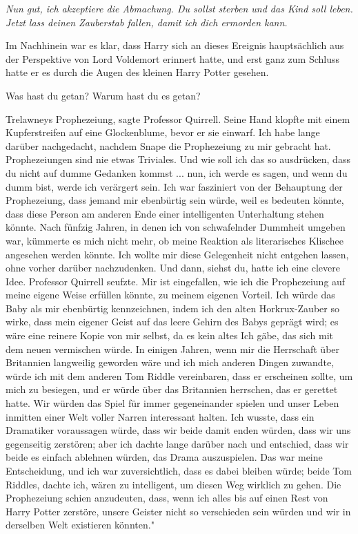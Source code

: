 \glqq{}\emph{Nun gut, ich akzeptiere die Abmachung. Du sollst sterben und das
Kind soll leben. Jetzt lass deinen Zauberstab fallen, damit ich dich ermorden
kann.}\grqq{}

Im Nachhinein war es klar, dass Harry sich an dieses Ereignis hauptsächlich aus
der Perspektive von Lord Voldemort erinnert hatte, und erst ganz zum Schluss
hatte er es durch die Augen des kleinen Harry Potter gesehen.

\glqq{}Was hast du getan? Warum hast du es getan?\grqq{}

\glqq{}Trelawneys Prophezeiung\grqq{}, sagte Professor Quirrell. Seine Hand
klopfte mit einem Kupferstreifen auf eine Glockenblume, bevor er sie einwarf.
\glqq{}Ich habe lange darüber nachgedacht, nachdem Snape die Prophezeiung zu mir
gebracht hat. Prophezeiungen sind nie etwas Triviales. Und wie soll ich das so
ausdrücken, dass du nicht auf dumme Gedanken kommst ... nun, ich werde es sagen,
und wenn du dumm bist, werde ich verärgert sein. Ich war fasziniert von der
Behauptung der Prophezeiung, dass jemand mir ebenbürtig sein würde, weil es
bedeuten könnte, dass diese Person am anderen Ende einer intelligenten
Unterhaltung stehen könnte. Nach fünfzig Jahren, in denen ich von schwafelnder
Dummheit umgeben war, kümmerte es mich nicht mehr, ob meine Reaktion als
literarisches Klischee angesehen werden könnte. Ich wollte mir diese Gelegenheit
nicht entgehen lassen, ohne vorher darüber nachzudenken. Und dann, siehst du,
hatte ich eine clevere Idee.\grqq{} Professor Quirrell seufzte. \glqq{}Mir ist
eingefallen, wie ich die Prophezeiung auf meine eigene Weise erfüllen könnte, zu
meinem eigenen Vorteil. Ich würde das Baby als mir ebenbürtig kennzeichnen,
indem ich den alten Horkrux-Zauber so wirke, dass mein eigener Geist auf das
leere Gehirn des Babys geprägt wird; es wäre eine reinere Kopie von mir selbst,
da es kein altes Ich gäbe, das sich mit dem neuen vermischen würde. In einigen
Jahren, wenn mir die Herrschaft über Britannien langweilig geworden wäre und ich
mich anderen Dingen zuwandte, würde ich mit dem anderen Tom Riddle vereinbaren,
dass er erscheinen sollte, um mich zu besiegen, und er würde über das Britannien
herrschen, das er gerettet hatte. Wir würden das Spiel für immer gegeneinander
spielen und unser Leben inmitten einer Welt voller Narren interessant halten.
Ich wusste, dass ein Dramatiker voraussagen würde, dass wir beide damit enden
würden, dass wir uns gegenseitig zerstören; aber ich dachte lange darüber nach
und entschied, dass wir beide es einfach ablehnen würden, das Drama
auszuspielen. Das war meine Entscheidung, und ich war zuversichtlich, dass es
dabei bleiben würde; beide Tom Riddles, dachte ich, wären zu intelligent, um
diesen Weg wirklich zu gehen. Die Prophezeiung schien anzudeuten, dass, wenn ich
alles bis auf einen Rest von Harry Potter zerstöre, unsere Geister nicht so
verschieden sein würden und wir in derselben Welt existieren könnten."

